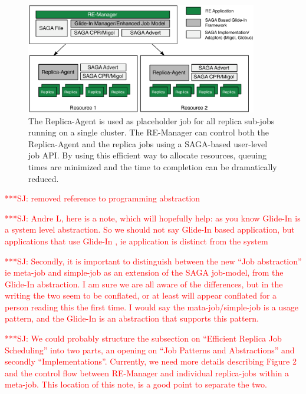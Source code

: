 \documentclass{rspublic}
\newcommand{\jhanote}[1]{ {\textcolor{red} { ***SJ: #1 }}}
\newcommand{\jhanote}[1]{}
\newcommand{\glidein}[1]{Glide-In }
\newcommand{\replicaagent}[1]{Replica-Agent }
\newcommand{\remanager}[1]{RE-Manager }
\begin{document}
\begin{figure}[t]
    \centering
    \includegraphics[width=0.9\textwidth]{remdmanager_v11}
    \caption{\footnotesize The Replica-Agent is used as placeholder
      job for all replica sub-jobs running on a single cluster. The
      \remanager\ can control both the \replicaagent\ and the replica
      jobs using a SAGA-based user-level job API. By using this
      efficient way to allocate resources, queuing times are minimized
      and the time to completion can be dramatically reduced.}
    \label{fig:remdmanager_v1.1}
\end{figure}

\jhanote{removed reference to programming abstraction}

\jhanote{Andre L, here is a note, which will hopefully help: as you
  know \glidein\ is a system level abstraction. So we should not say
  \glidein\ based application, but applications that use \glidein\ ,
  ie application is distinct from the system}

\jhanote{Secondly, it is important to distinguish between the new
  ``Job abstraction'' ie meta-job and simple-job as an extension of
  the SAGA job-model, from the \glidein\ abstraction. I am sure we are
  all aware of the differences, but in the writing the two seem to be
  conflated, or at least will appear conflated for a person reading
  this the first time. I would say the mata-job/simple-job is a usage
  pattern, and the \glidein\ is an abstraction that supports this
  pattern.}

\jhanote{We could probably structure the subsection on ``Efficient
  Replica Job Scheduling'' into two parts, an opening on ``Job
  Patterns and Abstractions'' and secondly
  ``Implementations''. Currently, we need more details describing
  Figure 2 and the control flow between \remanager\ and individual
  replica-jobs within a meta-job. This location of this note, is a
  good point to separate the two.}    
\end{document}
